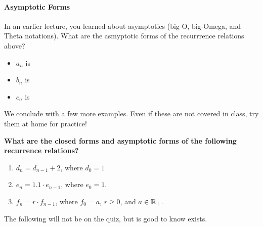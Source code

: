 \paragraph{Asymptotic Forms}
In an earlier lecture, you learned about asymptotics (big-O, big-Omega, and
Theta notations).  What are the asmyptotic forms of the recurrrence relations
above?

\begin{itemize}
    \item $a_n$ is
    \item $b_n$ is
    \item $c_n$ is
\end{itemize}

We conclude with a few more examples.  Even if these are not covered in class,
try them at home for practice!


{\bf What are the closed forms and asymptotic forms of the following recurrence
relations?}
\begin{enumerate}
    \item $d_n=d_{n-1}+2$, where $d_0=1$  %
    \item $e_n = 1.1\cdot e_{n-1}$, where $e_0=1$. %
    \item $f_n = r\cdot f_{n-1}$, where $f_0=a$, $r \geq 0$, and $a \in {\mathbb R}_+$. %
\end{enumerate}

\pagebreak

The following will not be on the quiz, but is good to know exists.

